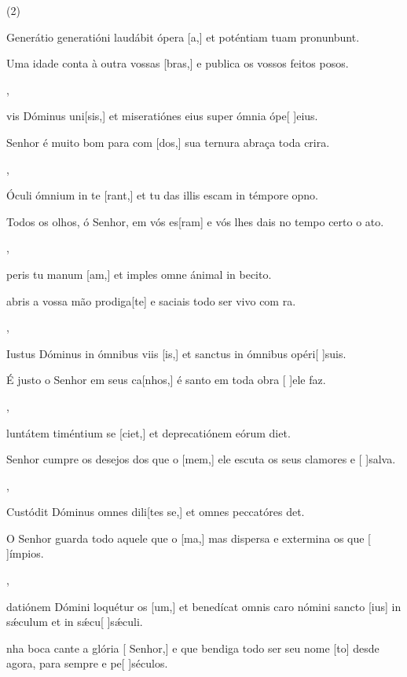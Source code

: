 \SetVersePairs(2){
  {\item {}Generátio generatióni laudábit ópera [a,] et poténtiam tuam pronunbunt.}%
    {\item {}Uma idade conta à outra vossas [bras,] e publica os vossos feitos posos.},
  {\item {}vis Dóminus uni[sis,] et miseratiónes eius super ómnia ópe[ ]{e}ius.}%
    {\item {} Senhor é muito bom para com [dos,] sua ternura abraça toda crira.},
  {\item {}Óculi ómnium in te [rant,] et tu das illis escam in témpore opno.}%
    {\item {}Todos os olhos, ó Senhor, em vós es[ram] e vós lhes dais no tempo certo o ato.},
  {\item {}peris tu manum [am,] et imples omne ánimal in be\-ci\-to.}%
    {\item {} abris a vossa mão prodiga[te] e saciais todo ser vivo com ra.},
  {\item {}Iustus Dóminus in ómnibus viis [is,] et sanctus in ómnibus opéri[ ]{su}is.}%
    {\item {}É justo o Senhor em seus ca[nhos,] é santo em toda obra [ ]{e}le faz.},
  {\item {}luntátem timéntium se [ciet,] et deprecatiónem eórum diet.}%
    {\item {} Senhor cumpre os desejos dos que o [mem,] ele escuta os seus clamores e [ ]{sal}va.},
  {\item {}Custódit Dóminus omnes dili[tes se,] et omnes peccatóres det.}%
    {\item {}O Senhor guarda todo aquele que o [ma,] mas dispersa e extermina os que [ ]{ím}pios.},
  {\item {}datiónem Dómini loquétur os [um,] et benedícat omnis caro nómini sancto [ius] in sǽculum et in sǽcu[ ]{sǽ}culi.}%
    {\item {}nha boca cante a glória [ Senhor,] e que bendiga todo ser seu nome [to] desde agora, para sempre e  pe[ ]{sé}culos.}
}